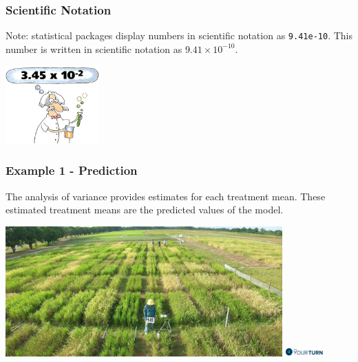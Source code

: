 \begin{frame}\frametitle{Scientific Notation}
Note: statistical packages display numbers in scientific notation as \texttt{9.41e-10}. This number is written in
scientific notation as $9.41\times 10^{-10}$.

\vspace{2cm}
\centering
\includegraphics[height = 3cm]{scinot}

\end{frame}



\begin{frame}\frametitle{Example 1 - Prediction}
The analysis of variance provides estimates for each treatment mean. These estimated
treatment means are the predicted values of the model.


\vspace{2cm}
\centering
\includegraphics[height = 5cm]{crdwheat}
\vspace{0.1cm}
\flushright
\includegraphics[height = 0.3cm]{yourturn}

\end{frame}




